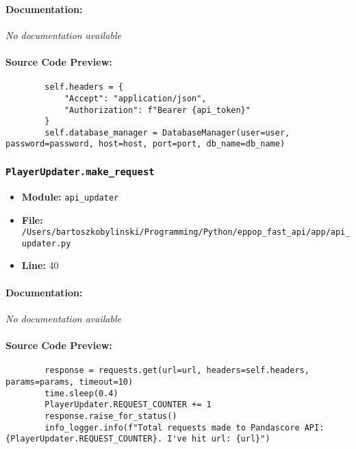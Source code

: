\documentclass[11pt,a4paper]{article}
\begin{document}
\paragraph{Documentation:} \textit{No documentation available}

\paragraph{Source Code Preview:}
\begin{verbatim}
        self.headers = {
            "Accept": "application/json",
            "Authorization": f"Bearer {api_token}"
        }
        self.database_manager = DatabaseManager(user=user, password=password, host=host, port=port, db_name=db_name)
\end{verbatim}

\vspace{1em}
\subsubsection{\texttt{PlayerUpdater.make\_request}}

\begin{itemize}
    \item \textbf{Module:} \texttt{api\_updater}
    \item \textbf{File:} \texttt{/Users/bartoszkobylinski/Programming/Python/eppop\_fast\_api/app/api\_updater.py}
    \item \textbf{Line:} 40
\end{itemize}

\paragraph{Documentation:} \textit{No documentation available}

\paragraph{Source Code Preview:}
\begin{verbatim}
        response = requests.get(url=url, headers=self.headers, params=params, timeout=10)
        time.sleep(0.4)
        PlayerUpdater.REQUEST_COUNTER += 1
        response.raise_for_status()
        info_logger.info(f"Total requests made to Pandascore API: {PlayerUpdater.REQUEST_COUNTER}. I've hit url: {url}")
\end{verbatim}

\vspace{1em}
\end{document}
